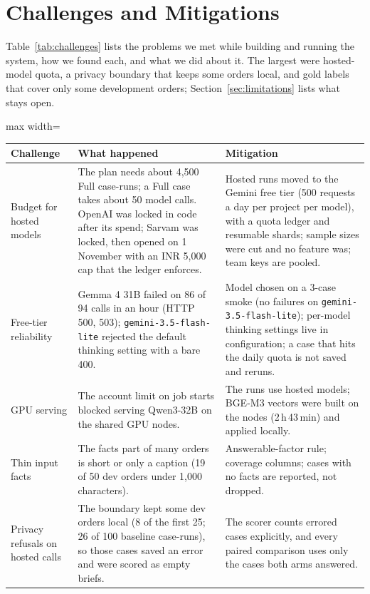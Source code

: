 \section{Challenges and Mitigations}
\label{sec:challenges}

Table~\ref{tab:challenges} lists the problems we met while building and running the system, how we found each, and what we did about it. The largest were hosted-model quota, a privacy boundary that keeps some orders local, and gold labels that cover only some development orders; Section~\ref{sec:limitations} lists what stays open.

\begin{table}[!t]
\centering\footnotesize
\begin{adjustbox}{max width=\textwidth}
\begin{tabular}{@{}p{4.6cm}p{5.4cm}p{5.2cm}@{}}
\toprule
Challenge & What happened & Mitigation \\
\midrule
Budget for hosted models & The plan needs about 4,500 Full case-runs; a Full case takes about 50 model calls. OpenAI was locked in code after its spend; Sarvam was locked, then opened on 1 November with an INR 5,000 cap that the ledger enforces. & Hosted runs moved to the Gemini free tier (500 requests a day per project per model), with a quota ledger and resumable shards; sample sizes were cut and no feature was; team keys are pooled. \\
Free-tier reliability & Gemma 4 31B failed on 86 of 94 calls in an hour (HTTP 500, 503); \texttt{gemini-3.5-flash-lite} rejected the default thinking setting with a bare 400. & Model chosen on a 3-case smoke (no failures on \texttt{gemini-3.5-flash-lite}); per-model thinking settings live in configuration; a case that hits the daily quota is not saved and reruns. \\
GPU serving & The account limit on job starts blocked serving Qwen3-32B on the shared GPU nodes. & The runs use hosted models; BGE-M3 vectors were built on the nodes (2\,h\,43\,min) and applied locally. \\
Thin input facts & The facts part of many orders is short or only a caption (19 of 50 dev orders under 1,000 characters). & Answerable-factor rule; coverage columns; cases with no facts are reported, not dropped. \\
Privacy refusals on hosted calls & The boundary kept some dev orders local (8 of the first 25; 26 of 100 baseline case-runs), so those cases saved an error and were scored as empty briefs. & The scorer counts errored cases explicitly, and every paired comparison uses only the cases both arms answered. \\

\end{tabular}
\end{adjustbox}
\end{table}

